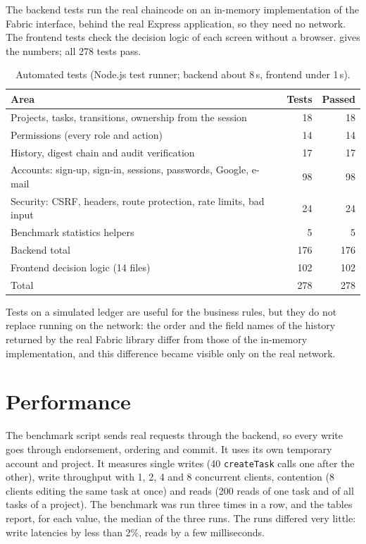 The backend tests run the real chaincode on an in-memory implementation of the Fabric interface, behind the real Express application, so they need no network. The frontend tests check the decision logic of each screen without a browser.  gives the numbers; all 278 tests pass.

\begin{table}[htbp]
    \centering
    \small
    \begin{tabular}{p{7.4cm}rr}
        \toprule
        Area & Tests & Passed \\
        \midrule
        Projects, tasks, transitions, ownership from the session & 18 & 18 \\
        Permissions (every role and action) & 14 & 14 \\
        History, digest chain and audit verification & 17 & 17 \\
        Accounts: sign-up, sign-in, sessions, passwords, Google, e-mail & 98 & 98 \\
        Security: CSRF, headers, route protection, rate limits, bad input & 24 & 24 \\
        Benchmark statistics helpers & 5 & 5 \\
        \midrule
        Backend total & 176 & 176 \\
        Frontend decision logic (14 files) & 102 & 102 \\
        \midrule
        Total & 278 & 278 \\
        \bottomrule
    \end{tabular}
    \caption{Automated tests (Node.js test runner; backend about 8\,s, frontend under 1\,s).}
    \label{tab:tests}
\end{table}

Tests on a simulated ledger are useful for the business rules, but they do not replace running on the network: the order and the field names of the history returned by the real Fabric library differ from those of the in-memory implementation, and this difference became visible only on the real network.

\section{Performance}
\label{sec:results-performance}

The benchmark script sends real requests through the backend, so every write goes through endorsement, ordering and commit. It uses its own temporary account and project. It measures single writes (40 \texttt{createTask} calls one after the other), write throughput with 1, 2, 4 and 8 concurrent clients, contention (8 clients editing the same task at once) and reads (200 reads of one task and of all tasks of a project). The benchmark was run three times in a row, and the tables report, for each value, the median of the three runs. The runs differed very little: write latencies by less than 2\%, reads by a few milliseconds.

